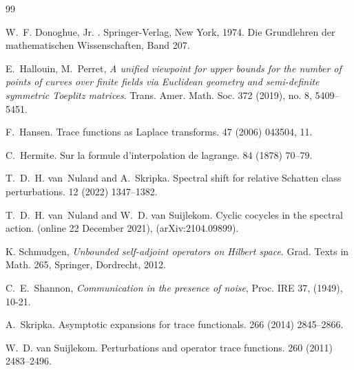 \documentclass{amsart}
\begin{document}
\begin{thebibliography}{99}
  
W.~F. Donoghue, Jr.
.
\newblock Springer-Verlag, New York, 1974.
\newblock Die Grundlehren der mathematischen Wissenschaften, Band 207.




 E.~Hallouin, M.~Perret, {\em A unified viewpoint for upper bounds for the number of points of curves over finite fields via Euclidean geometry and semi-definite symmetric Toeplitz matrices}. Trans. Amer. Math. Soc. 372 (2019), no. 8, 5409--5451. 


F.~Hansen.
\newblock Trace functions as {L}aplace transforms.
 47 (2006)  043504, 11.

C.~Hermite.
\newblock Sur la formule d'interpolation de lagrange.
 84 (1878)  70--79.


T.~D.~H. van~Nuland and A.~Skripka.
\newblock Spectral shift for relative {S}chatten class perturbations.
 12 (2022)  1347--1382.

T.~D.~H. van~Nuland and W.~D. van Suijlekom.
\newblock Cyclic cocycles in the spectral action.
 (online 22 December 2021),
  (arXiv:2104.09899).

   K. Schmudgen, {\em Unbounded self-adjoint operators on Hilbert space}. Grad. Texts in Math. 265, Springer, Dordrecht, 2012.

 C.~E.~Shannon, {\em Communication in the presence of noise}, Proc. IRE 37, (1949), 10-21.


    
A.~Skripka.
\newblock Asymptotic expansions for trace functionals.
 266 (2014)  2845--2866.

W.~D. van Suijlekom.
\newblock Perturbations and operator trace functions.
 260 (2011)  2483--2496.



\end{thebibliography}
\end{document}
